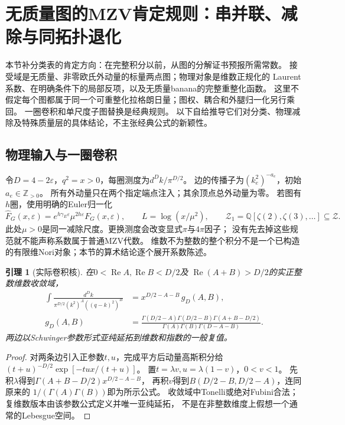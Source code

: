 \documentclass[11pt,a4paper]{ctexart}
\theoremstyle{cnplain}\newtheorem{theorem}{定理}[section]
\newtheorem{lemma}[theorem]{引理}
\theoremstyle{definition}\newtheorem{definition}[theorem]{定义}
\theoremstyle{remark}\newtheorem{remark}[theorem]{注}
\begin{document}
\section{无质量图的MZV肯定规则：串并联、减除与同拓扑退化}
\label{sec:masslessmzv}

本节补分类表的肯定方向：在完整积分以前，从图的分解证书预报所需常数。
接受域是无质量、非零欧氏外动量的标量两点图；物理对象是维数正规化的
Laurent系数、在明确条件下的局部反项，以及无质量banana的完整重整化函数。
这里不假定每个图都属于同一个可重整化拉格朗日量；图权、耦合和外腿归一化另行乘回。
一圈卷积和单尺度子图替换是经典规则\cite[式(1.2.1)、\S5.2.1]{PanzerMZV}。
以下自给推导它们对分类、物理减除及特殊质量层的具体结论，不主张经典公式的新颖性。

\subsection{物理输入与一圈卷积}
令$D=4-2\varepsilon$，$q^2=x>0$，每圈测度为$d^Dk/\pi^{D/2}$。
边的传播子为$(k_e^2)^{-a_e}$，初始$a_e\in\mathbb Z_{>0}$。
所有外动量只在两个指定端点注入；其余顶点总外动量为零。
若图有$h$圈，使用明确的Euler归一化
\[
 \widehat F_G(x,\varepsilon)
 =e^{h\gamma_E\varepsilon}\mu^{2h\varepsilon}F_G(x,\varepsilon),
 \qquad L=\log(x/\mu^2),\qquad
 \mathcal Z_1=\mathbb Q[\zeta(2),\zeta(3),\ldots]\subseteq\mathcal Z.
\]
此处$\mu>0$是同一减除尺度。更换测度会改变显式$\pi$与$4\pi$因子；
没有先去掉这些规范就不能声称系数属于普通MZV代数。
维数不为整数的整个积分不是一个已构造的有限维Nori对象；本节的算术结论逐个展开系数陈述。

\begin{lemma}[实际卷积核]\label{lem:masslesskernel}
在$0<\operatorname{Re} A,\operatorname{Re} B<D/2$及
$\operatorname{Re}(A+B)>D/2$的实正整数维数收敛域，
\begin{align}
 \int\frac{d^Dk}{\pi^{D/2}(k^2)^A((q-k)^2)^B}
 &=x^{D/2-A-B}\,g_D(A,B),\\
 g_D(A,B)&=
 \frac{\Gamma(D/2-A)\Gamma(D/2-B)\Gamma(A+B-D/2)}
 {\Gamma(A)\Gamma(B)\Gamma(D-A-B)}.\label{eq:masslesskernel}
\end{align}
两边以Schwinger参数形式亚纯延拓到维数和指数的一般复值。
\end{lemma}
\begin{proof}
对两条边引入正参数$t,u$，完成平方后动量高斯积分给
$(t+u)^{-D/2}\exp[-tu x/(t+u)]$。
置$t=\lambda v,u=\lambda(1-v)$，$0<v<1$。
先积$\lambda$得到$\Gamma(A+B-D/2)x^{D/2-A-B}$，
再积$v$得到$B(D/2-B,D/2-A)$，连同原来的
$1/(\Gamma(A)\Gamma(B))$即为所示公式。
收敛域中Tonelli或绝对Fubini合法；复维数版本由该参数公式定义并唯一亚纯延拓，
不是在非整数维度上假想一个通常的Lebesgue空间。
\end{proof}
\end{document}
